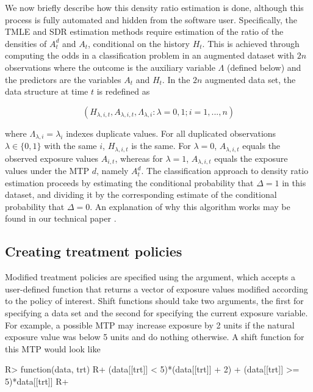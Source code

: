 \documentclass[]{jss}
\begin{document}
We now briefly describe how this density ratio estimation is done,
although this process is fully automated and hidden from the software
user. Specifically, the TMLE and SDR estimation methods require
estimation of the ratio of the densities of $A_t^d$ and $A_t$,
conditional on the history $H_t$. This is achieved through computing
the odds in a classification problem in an augmented dataset with $2n$
observations where the outcome is the auxiliary variable $\Lambda$
(defined below) and the predictors are the variables $A_t$ and
$H_t$. In the $2n$ augmented data set, the data structure at time
\(t\) is redefined as

\begin{equation}
(H_{\lambda, i, t}, A_{\lambda, i, t}, \Lambda_{\lambda, i} : \lambda = 0, 1; i = 1, ..., n)
\end{equation}

where \(\Lambda_{\lambda, i} = \lambda_i\) indexes duplicate values.
For all duplicated observations $\lambda\in\{0,1\}$ with the same $i$,
\(H_{\lambda, i, t}\) is the same. For $\lambda = 0$,
$A_{\lambda, i, t}$ equals the observed exposure values $A_{i, t}$,
whereas for $\lambda=1$, $A_{\lambda, i, t}$ equals the exposure
values under the MTP \(d\), namely \(A^{d}_t\). The classification
approach to density ratio estimation proceeds by estimating the conditional
probability that $\Delta=1$ in this dataset, and dividing it by the
corresponding estimate of the conditional probability that
$\Delta=0$. An explanation of why this algorithm works may be found in
our technical paper  \citep{diazNonparametricCausalEffects2020a}.

\hypertarget{creating-treatment-policies}{%
\subsection{Creating treatment policies}\label{creating-treatment-policies}}

Modified treatment policies are specified using the  argument, which
accepts a user-defined function that returns a vector of exposure values
modified according to the policy of interest. Shift functions should take two
arguments, the first for specifying a data set and the second for
specifying the current exposure variable. For example, a possible MTP
may increase exposure by 2 units if the natural exposure value was below
5 units and do nothing otherwise. A shift function for this MTP would
look like

\begin{CodeChunk}

\begin{CodeInput}
R> function(data, trt) {
R+  (data[[trt]] < 5)*(data[[trt]] + 2) + (data[[trt]] >= 5)*data[[trt]]
R+ }
\end{CodeInput}

\end{CodeChunk}
\end{document}
